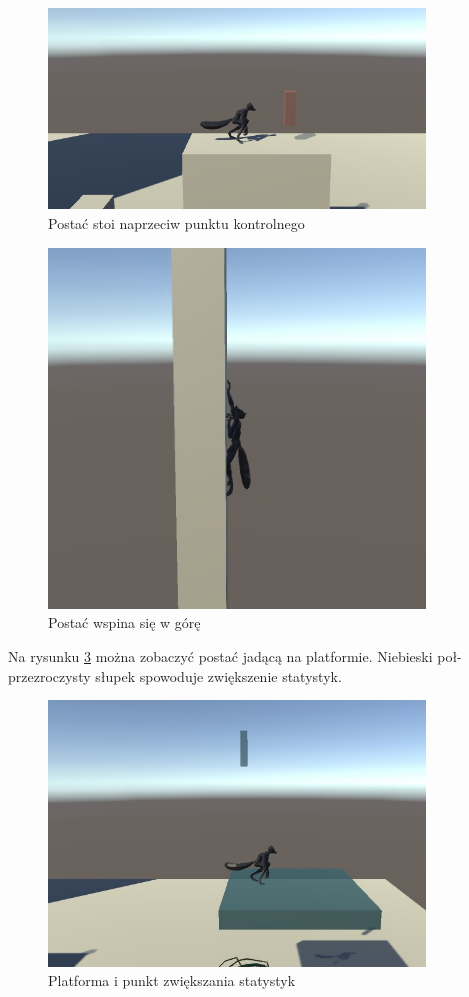 \documentclass[12pt,twoside]{article}
\begin{document}
\begin{figure}[ht]
    \centering
	\includegraphics[width=10cm]{RealizacjaProjektu/UnityPictires/Checkpoint.jpg}
	\caption{Postać stoi naprzeciw punktu kontrolnego}
    \label{Hero:Checkpoint}
\end{figure}
\begin{figure}[ht]
    \centering
	\includegraphics[width=10cm]{RealizacjaProjektu/UnityPictires/Climbing.jpg}
	\caption{Postać wspina się w górę}
    \label{Hero:Climbing}
\end{figure}
Na rysunku \ref{PltafromStats} można zobaczyć postać jadącą na platformie.
Niebieski poł-przezroczysty słupek spowoduje zwiększenie statystyk. 
\begin{figure}[ht]
    \centering
	\includegraphics[width=10cm]{RealizacjaProjektu/UnityPictires/StatsUpgrade_platform.jpg}
	\caption{Platforma i punkt zwiększania statystyk}
    \label{PltafromStats}
\end{figure}
\end{document}
